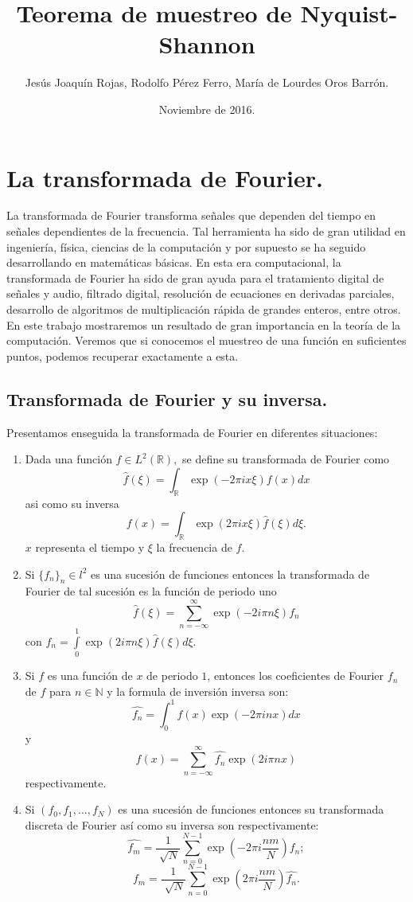 \documentclass[a4paper]{article}
\title{\textbf{Teorema de muestreo de Nyquist-Shannon}}
\author{Jesús Joaquín Rojas, Rodolfo Pérez Ferro, María de Lourdes Oros Barrón.}
\date{Noviembre de 2016.}
\begin{document}
\sffamily
\maketitle

\section{\sffamily La transformada de Fourier.}
La transformada de Fourier transforma señales que dependen del tiempo en señales dependientes de la frecuencia. 
Tal herramienta ha sido de gran utilidad en ingeniería, física, ciencias de la computación y por supuesto se ha seguido desarrollando en matemáticas básicas. En esta era computacional, la transformada de Fourier ha sido de gran ayuda para el tratamiento digital de señales y audio, filtrado digital, resolución de ecuaciones en derivadas parciales, desarrollo de algoritmos de multiplicación rápida de grandes enteros, entre otros.\\
En este trabajo mostraremos un resultado de gran importancia en la teoría de la computación. Veremos que si conocemos el muestreo de una función en suficientes puntos, podemos recuperar exactamente a esta.\\

\subsection{\sffamily Transformada de Fourier y su inversa.}
Presentamos enseguida la transformada de Fourier en diferentes situaciones:\\
\begin{enumerate}
\item Dada una función $f\in L^{2}\mathbb{(R)},$ se define su transformada de Fourier como $$
\widehat{f}(\xi)=\int_{\mathbb{R}} \exp(-2\pi ix\xi)f(x)dx
$$ asi como su inversa
$$
f(x)=\int_{\mathbb{R}} \exp(2\pi i x\xi) \widehat{f}(\xi)d\xi.
$$
$x$ representa el tiempo y $\xi$ la frecuencia de $f.$
\\
\item Si $\{f_{n}\}_{n} \in l^{2}$ es una sucesión de funciones entonces la transformada de Fourier de tal sucesión es la función de periodo uno
$$
\widehat{f}(\xi)=\sum_{n=-\infty}^{\infty} \exp(-2i\pi n\xi)f_{n}
$$ con $f_{n}=\int\limits_{0}^{1}\exp(2i\pi n\xi) \widehat{f}(\xi)d\xi.$
\\
\item Si $f$ es una función de $x$ de periodo $1$, entonces los coeficientes de Fourier $f_{n}$ de $f$ para $n\in \mathbb{N}$ y la formula de inversión inversa son:
$$
\widehat{f_{n}}=\int_{0}^{1}f(x)\exp(-2\pi inx)dx
$$ y $$
f(x)=\sum_{n=-\infty}^{\infty} \widehat{f_{n}}\exp(2i\pi nx)
$$ respectivamente.
\\
\item Si $(f_{0},f_{1},...,f_{N})$ es una sucesión de funciones entonces su transformada discreta de Fourier así como su inversa son respectivamente:
$$
\widehat{f_{m}}=\frac{1}{\sqrt[]{N}}\sum_{n=0}^{N-1}\exp\left(-2\pi i\frac{nm}{N}\right)f_{n};
$$ $$
f_{m}=\frac{1}{\sqrt[]{N}}\sum_{n=0}^{N-1}\exp\left(2\pi i\frac{nm}{N}\right)\widehat{f_{n}}.
$$
\end{enumerate}
\end{document}
